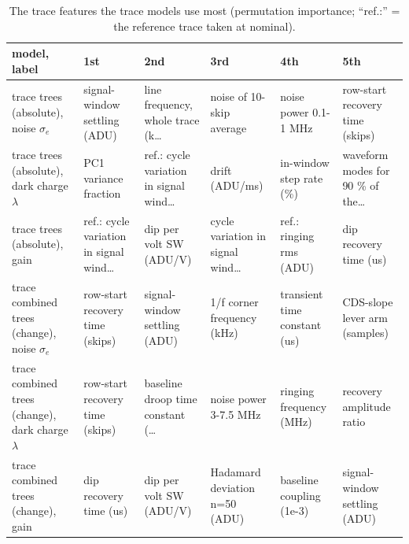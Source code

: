 \begin{table}[H]\centering\small
\caption{The trace features the trace models use most (permutation importance; ``ref.:'' = the reference trace taken at nominal).}
\begin{tabular}{p{3.6cm}p{2.3cm}p{2.3cm}p{2.3cm}p{2.3cm}p{2.3cm}}\toprule
model, label & 1st & 2nd & 3rd & 4th & 5th\\\midrule
trace trees (absolute), noise $\sigma_e$ & signal-window settling (ADU) & line frequency, whole trace (k\dots{} & noise of 10-skip average & noise power 0.1-1 MHz & row-start recovery time (skips)\\
trace trees (absolute), dark charge $\lambda$ & PC1 variance fraction & ref.: cycle variation in signal wind\dots{} & drift (ADU/ms) & in-window step rate (\%) & waveform modes for 90 \% of the\dots{}\\
trace trees (absolute), gain & ref.: cycle variation in signal wind\dots{} & dip per volt SW (ADU/V) & cycle variation in signal wind\dots{} & ref.: ringing rms (ADU) & dip recovery time (us)\\
trace combined trees (change), noise $\sigma_e$ & row-start recovery time (skips) & signal-window settling (ADU) & 1/f corner frequency (kHz) & transient time constant (us) & CDS-slope lever arm (samples)\\
trace combined trees (change), dark charge $\lambda$ & row-start recovery time (skips) & baseline droop time constant (\dots{} & noise power 3-7.5 MHz & ringing frequency (MHz) & recovery amplitude ratio\\
trace combined trees (change), gain & dip recovery time (us) & dip per volt SW (ADU/V) & Hadamard deviation n=50 (ADU) & baseline coupling (1e-3) & signal-window settling (ADU)\\
\bottomrule\end{tabular}\end{table}

